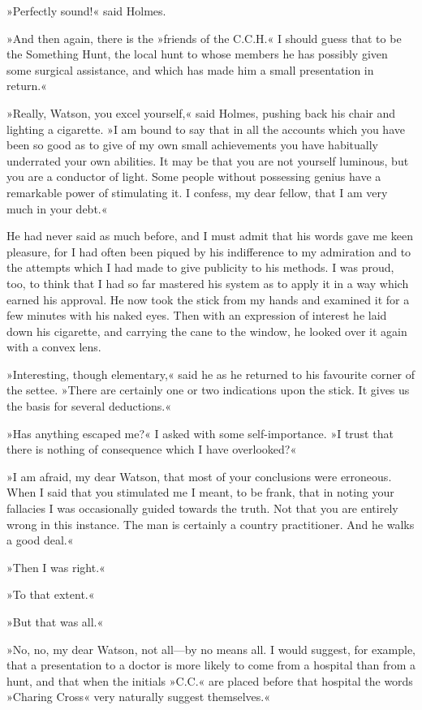 »Perfectly sound!« said Holmes.

»And then again, there is the »friends of the C.C.H.« I should guess that to be the Something Hunt, the local hunt to whose members he has possibly given some surgical assistance, and which has made him a small presentation in return.«

»Really, Watson, you excel yourself,« said Holmes, pushing back his chair and lighting a cigarette. »I am bound to say that in all the accounts which you have been so good as to give of my own small achievements you have habitually underrated your own abilities. It may be that you are not yourself luminous, but you are a conductor of light. Some people without possessing genius have a remarkable power of stimulating it. I confess, my dear fellow, that I am very much in your debt.«

He had never said as much before, and I must admit that his words gave me keen pleasure, for I had often been piqued by his indifference to my admiration and to the attempts which I had made to give publicity to his methods. I was proud, too, to think that I had so far mastered his system as to apply it in a way which earned his approval. He now took the stick from my hands and examined it for a few minutes with his naked eyes. Then with an expression of interest he laid down his cigarette, and carrying the cane to the window, he looked over it again with a convex lens.

»Interesting, though elementary,« said he as he returned to his favourite corner of the settee. »There are certainly one or two indications upon the stick. It gives us the basis for several deductions.«

»Has anything escaped me?« I asked with some self-importance. »I trust that there is nothing of consequence which I have overlooked?«

»I am afraid, my dear Watson, that most of your conclusions were erroneous. When I said that you stimulated me I meant, to be frank, that in noting your fallacies I was occasionally guided towards the truth. Not that you are entirely wrong in this instance. The man is certainly a country practitioner. And he walks a good deal.«

»Then I was right.«

»To that extent.«

»But that was all.«

»No, no, my dear Watson, not all—by no means all. I would suggest, for example, that a presentation to a doctor is more likely to come from a hospital than from a hunt, and that when the initials »C.C.« are placed before that hospital the words »Charing Cross« very naturally suggest themselves.«

